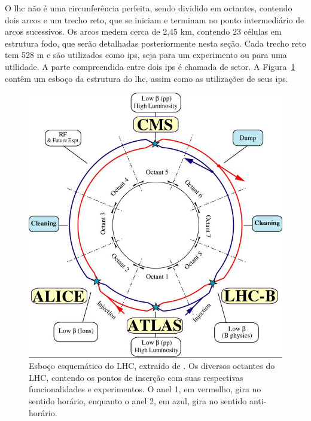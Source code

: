 

O \gls{lhc} não é uma circunferência perfeita, sendo dividido em octantes, 
contendo dois arcos e um trecho reto, que se iniciam e terminam no ponto
intermediário de arcos sucessivos. Os arcos medem cerca de 2,45 km,
contendo 23 células em estrutura \gls{fodo}, que serão detalhadas
posteriormente nesta seção. 
Cada trecho reto tem 528 m e são utilizados como \glspl{ip},
seja para um experimento ou para uma utilidade. A parte
compreendida entre dois \glspl{ip} é chamada de setor. A 
Figura~\ref{fig:esquema_lhc} contêm um esboço da estrutura do \gls{lhc}, assim
como as utilizações de seus \glspl{ip}.

\begin{figure}[h!t]
\centering
\includegraphics[width=.6\textwidth]{imagens/lhc-schematic.png}
\caption[Esboço esquemático do LHC]{Esboço esquemático do LHC, extraído de
\cite{webLHC}. Os diversos octantes do LHC, contendo os pontos de inserção 
com suas respectivas funcionalidades e experimentos.
O anel 1, em vermelho, gira no sentido horário, enquanto o anel
2, em azul, gira no sentido anti-horário.}
\label{fig:esquema_lhc}
\end{figure}

